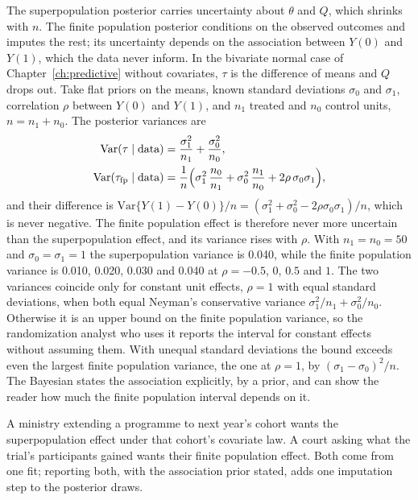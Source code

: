 The superpopulation posterior carries uncertainty about $\theta$ and $Q$, which shrinks with $n$. The finite population posterior conditions on the observed outcomes and imputes the rest; its uncertainty depends on the association between $Y(0)$ and $Y(1)$, which the data never inform. In the bivariate normal case of Chapter~\ref{ch:predictive} without covariates, $\tau$ is the difference of means and $Q$ drops out. Take flat priors on the means, known standard deviations $\sigma_0$ and $\sigma_1$, correlation $\rho$ between $Y(0)$ and $Y(1)$, and $n_1$ treated and $n_0$ control units, $n = n_1 + n_0$. The posterior variances are
\begin{align*}
\mathrm{Var}(\tau \mid \text{data}) &= \frac{\sigma_1^2}{n_1} + \frac{\sigma_0^2}{n_0}, \\
\mathrm{Var}(\tau_{\mathrm{fp}} \mid \text{data}) &= \frac{1}{n}\Bigl(\sigma_1^2\,\frac{n_0}{n_1} + \sigma_0^2\,\frac{n_1}{n_0} + 2\rho\,\sigma_0\sigma_1\Bigr),
\end{align*}
and their difference is $\mathrm{Var}\{Y(1) - Y(0)\}/n = (\sigma_1^2 + \sigma_0^2 - 2\rho\sigma_0\sigma_1)/n$, which is never negative. The finite population effect is therefore never more uncertain than the superpopulation effect, and its variance rises with $\rho$. With $n_1 = n_0 = 50$ and $\sigma_0 = \sigma_1 = 1$ the superpopulation variance is 0.040, while the finite population variance is 0.010, 0.020, 0.030 and 0.040 at $\rho = -0.5$, $0$, $0.5$ and $1$. The two variances coincide only for constant unit effects, $\rho = 1$ with equal standard deviations, when both equal Neyman's conservative variance $\sigma_1^2/n_1 + \sigma_0^2/n_0$. Otherwise it is an upper bound on the finite population variance, so the randomization analyst who uses it reports the interval for constant effects without assuming them. With unequal standard deviations the bound exceeds even the largest finite population variance, the one at $\rho = 1$, by $(\sigma_1 - \sigma_0)^2/n$. The Bayesian states the association explicitly, by a prior, and can show the reader how much the finite population interval depends on it.

A ministry extending a programme to next year's cohort wants the superpopulation effect under that cohort's covariate law. A court asking what the trial's participants gained wants their finite population effect. Both come from one fit; reporting both, with the association prior stated, adds one imputation step to the posterior draws.

